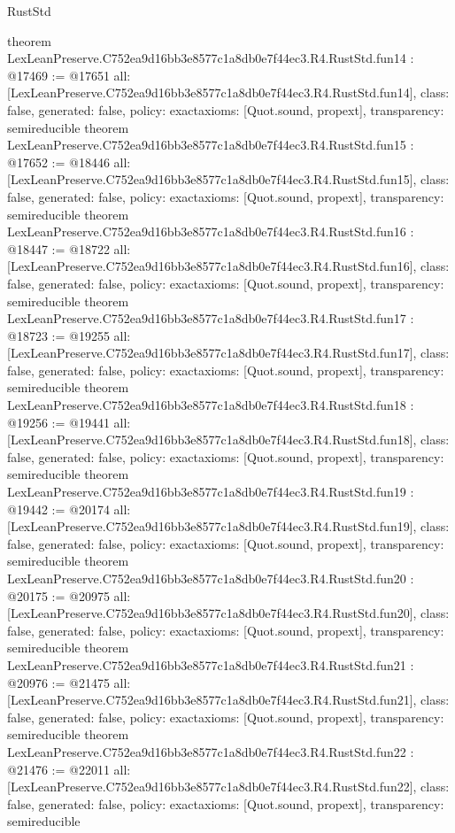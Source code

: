 \begin{lexlean}{RustStd}
\begin{coremodule}
{}
theorem LexLeanPreserve.C752ea9d16bb3e8577c1a8db0e7f44ec3.R4.RustStd.fun14 : @17469 := @17651 {
  all: [LexLeanPreserve.C752ea9d16bb3e8577c1a8db0e7f44ec3.R4.RustStd.fun14],
  class: false,
  generated: false,
  policy: exact{axioms: [Quot.sound, propext]},
  transparency: semireducible
}
theorem LexLeanPreserve.C752ea9d16bb3e8577c1a8db0e7f44ec3.R4.RustStd.fun15 : @17652 := @18446 {
  all: [LexLeanPreserve.C752ea9d16bb3e8577c1a8db0e7f44ec3.R4.RustStd.fun15],
  class: false,
  generated: false,
  policy: exact{axioms: [Quot.sound, propext]},
  transparency: semireducible
}
theorem LexLeanPreserve.C752ea9d16bb3e8577c1a8db0e7f44ec3.R4.RustStd.fun16 : @18447 := @18722 {
  all: [LexLeanPreserve.C752ea9d16bb3e8577c1a8db0e7f44ec3.R4.RustStd.fun16],
  class: false,
  generated: false,
  policy: exact{axioms: [Quot.sound, propext]},
  transparency: semireducible
}
theorem LexLeanPreserve.C752ea9d16bb3e8577c1a8db0e7f44ec3.R4.RustStd.fun17 : @18723 := @19255 {
  all: [LexLeanPreserve.C752ea9d16bb3e8577c1a8db0e7f44ec3.R4.RustStd.fun17],
  class: false,
  generated: false,
  policy: exact{axioms: [Quot.sound, propext]},
  transparency: semireducible
}
theorem LexLeanPreserve.C752ea9d16bb3e8577c1a8db0e7f44ec3.R4.RustStd.fun18 : @19256 := @19441 {
  all: [LexLeanPreserve.C752ea9d16bb3e8577c1a8db0e7f44ec3.R4.RustStd.fun18],
  class: false,
  generated: false,
  policy: exact{axioms: [Quot.sound, propext]},
  transparency: semireducible
}
theorem LexLeanPreserve.C752ea9d16bb3e8577c1a8db0e7f44ec3.R4.RustStd.fun19 : @19442 := @20174 {
  all: [LexLeanPreserve.C752ea9d16bb3e8577c1a8db0e7f44ec3.R4.RustStd.fun19],
  class: false,
  generated: false,
  policy: exact{axioms: [Quot.sound, propext]},
  transparency: semireducible
}
theorem LexLeanPreserve.C752ea9d16bb3e8577c1a8db0e7f44ec3.R4.RustStd.fun20 : @20175 := @20975 {
  all: [LexLeanPreserve.C752ea9d16bb3e8577c1a8db0e7f44ec3.R4.RustStd.fun20],
  class: false,
  generated: false,
  policy: exact{axioms: [Quot.sound, propext]},
  transparency: semireducible
}
theorem LexLeanPreserve.C752ea9d16bb3e8577c1a8db0e7f44ec3.R4.RustStd.fun21 : @20976 := @21475 {
  all: [LexLeanPreserve.C752ea9d16bb3e8577c1a8db0e7f44ec3.R4.RustStd.fun21],
  class: false,
  generated: false,
  policy: exact{axioms: [Quot.sound, propext]},
  transparency: semireducible
}
theorem LexLeanPreserve.C752ea9d16bb3e8577c1a8db0e7f44ec3.R4.RustStd.fun22 : @21476 := @22011 {
  all: [LexLeanPreserve.C752ea9d16bb3e8577c1a8db0e7f44ec3.R4.RustStd.fun22],
  class: false,
  generated: false,
  policy: exact{axioms: [Quot.sound, propext]},
  transparency: semireducible
}
\end{coremodule}
\end{lexlean}
